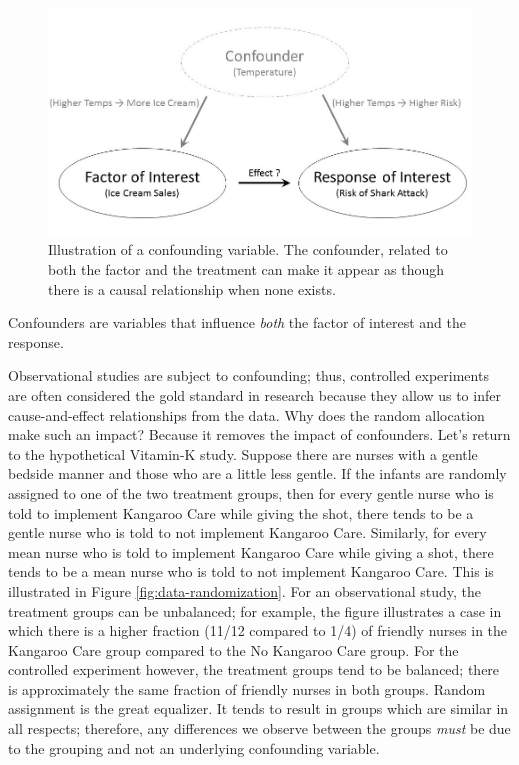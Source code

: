 \documentclass[
]{book}
\theoremstyle{plain}
\theoremstyle{mydefn}
\theoremstyle{myexmpl}
\theoremstyle{remark}
\begin{document}
\begin{figure}

{\centering \includegraphics[width=0.8\linewidth]{./images/Data-Confounding} 

}

\caption{Illustration of a confounding variable. The confounder, related to both the factor and the treatment can make it appear as though there is a causal relationship when none exists.}\label{fig:data-confounding}
\end{figure}

\begin{rmdtip}
Confounders are variables that influence \emph{both} the factor of interest and the response.
\end{rmdtip}

Observational studies are subject to confounding; thus, controlled experiments are often considered the gold standard in research because they allow us to infer cause-and-effect relationships from the data. Why does the random allocation make such an impact? Because it removes the impact of confounders. Let's return to the hypothetical Vitamin-K study. Suppose there are nurses with a gentle bedside manner and those who are a little less gentle. If the infants are randomly assigned to one of the two treatment groups, then for every gentle nurse who is told to implement Kangaroo Care while giving the shot, there tends to be a gentle nurse who is told to not implement Kangaroo Care. Similarly, for every mean nurse who is told to implement Kangaroo Care while giving a shot, there tends to be a mean nurse who is told to not implement Kangaroo Care. This is illustrated in Figure \ref{fig:data-randomization}. For an observational study, the treatment groups can be unbalanced; for example, the figure illustrates a case in which there is a higher fraction (11/12 compared to 1/4) of friendly nurses in the Kangaroo Care group compared to the No Kangaroo Care group. For the controlled experiment however, the treatment groups tend to be balanced; there is approximately the same fraction of friendly nurses in both groups. Random assignment is the great equalizer. It tends to result in groups which are similar in all respects; therefore, any differences we observe between the groups \emph{must} be due to the grouping and not an underlying confounding variable.
\end{document}
